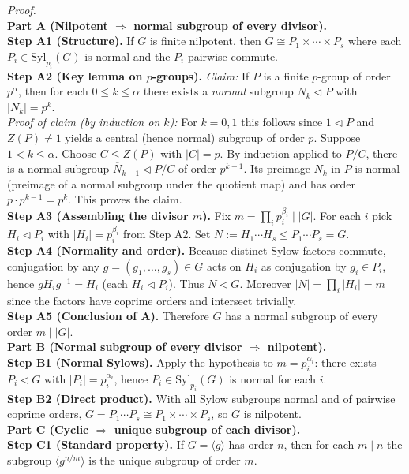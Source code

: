 \documentclass[12pt]{article}
\theoremstyle{definition}
\begin{document}
\emph{Proof.}\\
\textbf{Part A (Nilpotent $\Rightarrow$ normal subgroup of every divisor).}\\
\textbf{Step A1 (Structure).} If $G$ is finite nilpotent, then $G\cong P_1\times\cdots\times P_s$ where each $P_i\in\mathrm{Syl}_{p_i}(G)$ is normal and the $P_i$ pairwise commute.\\
\textbf{Step A2 (Key lemma on $p$-groups).} \emph{Claim:} If $P$ is a finite $p$-group of order $p^\alpha$, then for each $0\le k\le \alpha$ there exists a \emph{normal} subgroup $N_k\lhd P$ with $|N_k|=p^k$. \\
\quad\emph{Proof of claim (by induction on $k$):} For $k=0,1$ this follows since $1\lhd P$ and $Z(P)\neq 1$ yields a central (hence normal) subgroup of order $p$. Suppose $1<k\le \alpha$. Choose $C\le Z(P)$ with $|C|=p$. By induction applied to $P/C$, there is a normal subgroup $\overline{N}_{k-1}\lhd P/C$ of order $p^{k-1}$. Its preimage $N_k$ in $P$ is normal (preimage of a normal subgroup under the quotient map) and has order $p\cdot p^{k-1}=p^k$. This proves the claim.\\
\textbf{Step A3 (Assembling the divisor $m$).} Fix $m=\prod_i p_i^{\beta_i}\mid |G|$. For each $i$ pick $H_i\lhd P_i$ with $|H_i|=p_i^{\beta_i}$ from Step A2. Set $N:=H_1\cdots H_s\le P_1\cdots P_s=G$.\\
\textbf{Step A4 (Normality and order).} Because distinct Sylow factors commute, conjugation by any $g=(g_1,\dots,g_s)\in G$ acts on $H_i$ as conjugation by $g_i\in P_i$, hence $gH_ig^{-1}=H_i$ (each $H_i\lhd P_i$). Thus $N\lhd G$. Moreover $|N|=\prod_i |H_i|=m$ since the factors have coprime orders and intersect trivially.\\
\textbf{Step A5 (Conclusion of A).} Therefore $G$ has a normal subgroup of every order $m\mid |G|$.\\

\medskip
\textbf{Part B (Normal subgroup of every divisor $\Rightarrow$ nilpotent).}\\
\textbf{Step B1 (Normal Sylows).} Apply the hypothesis to $m=p_i^{\alpha_i}$: there exists $P_i\lhd G$ with $|P_i|=p_i^{\alpha_i}$, hence $P_i\in\mathrm{Syl}_{p_i}(G)$ is normal for each $i$.\\
\textbf{Step B2 (Direct product).} With all Sylow subgroups normal and of pairwise coprime orders, $G=P_1\cdots P_s\cong P_1\times\cdots\times P_s$, so $G$ is nilpotent.\\

\medskip
\textbf{Part C (Cyclic $\Rightarrow$ unique subgroup of each divisor).}\\
\textbf{Step C1 (Standard property).} If $G=\langle g\rangle$ has order $n$, then for each $m\mid n$ the subgroup $\langle g^{n/m}\rangle$ is the unique subgroup of order $m$.\\
\end{document}
